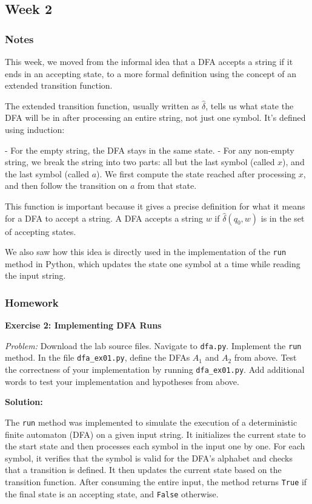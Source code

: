 \documentclass{article}
\theoremstyle{theorem}
\theoremstyle{definition}
\theoremstyle{remark}
\begin{document}
\subsection{Week 2}

\subsubsection{Notes}

This week, we moved from the informal idea that a DFA accepts a string if it ends in an accepting state, to a more formal definition using the concept of an extended transition function.

The extended transition function, usually written as $\hat{\delta}$, tells us what state the DFA will be in after processing an entire string, not just one symbol. It's defined using induction:

- For the empty string, the DFA stays in the same state.
- For any non-empty string, we break the string into two parts: all but the last symbol (called $x$), and the last symbol (called $a$). We first compute the state reached after processing $x$, and then follow the transition on $a$ from that state.

This function is important because it gives a precise definition for what it means for a DFA to accept a string. A DFA accepts a string $w$ if $\hat{\delta}(q_0, w)$ is in the set of accepting states.

We also saw how this idea is directly used in the implementation of the \texttt{run} method in Python, which updates the state one symbol at a time while reading the input string.


\subsubsection{Homework}

\textbf{Exercise 2: Implementing DFA Runs}

\textit{Problem:}  
Download the lab source files. Navigate to \texttt{dfa.py}. Implement the \texttt{run} method.  
In the file \texttt{dfa\_ex01.py}, define the DFAs $A_1$ and $A_2$ from above.  
Test the correctness of your implementation by running \texttt{dfa\_ex01.py}.  
Add additional words to test your implementation and hypotheses from above.

\vspace{0.5em}

\textbf{Solution:}

The \texttt{run} method was implemented to simulate the execution of a deterministic finite automaton (DFA) on a given input string. It initializes the current state to the start state and then processes each symbol in the input one by one. For each symbol, it verifies that the symbol is valid for the DFA's alphabet and checks that a transition is defined. It then updates the current state based on the transition function. After consuming the entire input, the method returns \texttt{True} if the final state is an accepting state, and \texttt{False} otherwise.
\end{document}
